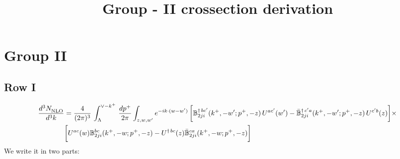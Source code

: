 \documentclass[9pt]{article}
\title{Group - II crossection derivation}
\author{}
\date{}
\def\mf#1{\mathbb{#1}}
\numberwithin{equation}{section}
\begin{document}
\maketitle
\section{Group II}
\subsection{Row I\,}
\begin{align}
    \frac{d^{3}N_{\rm NLO}^{\rm}}{d^{3}k}  & = \frac{4}{(2\pi)^{3}}\,\int_{\Lambda}^{\vee-k^{+}}\, \frac{dp^{+}}{2\pi}\int_{z,w,w^{\prime}} e^{-ik\cdot (w-w')}\, \bigg[\mf{B}^{\dagger\, bc^{\prime}}_{2ji}(k^{+},-w^{\prime};p^{+},-z)\,U^{ac^{\prime}}(w^{\prime}) -\Bar{\mf{B}}^{\dagger\, c^{\prime}a}_{2ji}(k^{+},-w^{\prime}; p^{+},-z)\,U^{c^{\prime}b}(z)\bigg]\times\notag \\ & \bigg[U^{ac}(w) \mf{B}^{bc}_{2ji}(k^{+},-w;p^{+},-z) -U^{\dagger\, bc}(z)\Bar{\mf{B}}^{ca}_{2ji}(k^{+},-w; p^{+},-z)\bigg]\nonumber
\end{align}
We write it in two parts: 
\end{document}
